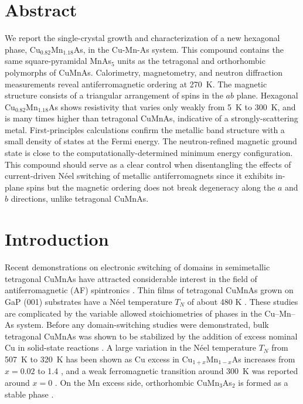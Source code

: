 \documentclass[10pt,doublespacing,edeposit]{uiucthesis2020}
\begin{document}
\begin{mainmatter}

\section{Abstract}
We report the single-crystal growth and characterization of a new hexagonal phase, Cu$_{0.82}$Mn$_{1.18}$As, in the Cu-Mn-As system. 
This compound contains the same square-pyramidal MnAs$_5$ units as the tetragonal and orthorhombic polymorphs of CuMnAs.
Calorimetry, magnetometry, and neutron diffraction measurements reveal antiferromagnetic ordering at 270~K.
The magnetic structure consists of a triangular arrangement of spins in the $ab$ plane. 
Hexagonal Cu$_{0.82}$Mn$_{1.18}$As shows resistivity that varies only weakly from 5~K to 300~K, and is many times higher than tetragonal CuMnAs, indicative of a strongly-scattering metal.
First-principles calculations confirm the metallic band structure with a small density of states at the Fermi energy. The neutron-refined
magnetic ground state is close to the computationally-determined minimum energy configuration. This compound should serve as a clear control when disentangling the effects of current-driven N\'{e}el switching of metallic antiferromagnets since it exhibits in-plane spins but the magnetic ordering does not break degeneracy along the $a$ and $b$ directions, unlike tetragonal CuMnAs.


\section{Introduction} 

Recent demonstrations on electronic switching of domains in  semimetallic tetragonal CuMnAs have attracted considerable interest in the field of antiferromagnetic (AF) spintronics \cite{Wadley2016,Grzybowski2017,Wadley2018,Matalla-Wagner2019}. Thin films of tetragonal CuMnAs grown on GaP (001) substrates have a N\'eel temperature $T_N$ of about 480 K \cite{Wadley2015,Hills2015}.
These studies are complicated by the variable allowed stoichiometries of  phases in the Cu--Mn--As system.
Before any domain-switching studies were demonstrated, bulk tetragonal CuMnAs was shown to be 
stabilized by the addition of excess nominal Cu in solid-state reactions \cite{Uhlirova2015}.
A large variation in the N\'{e}el temperature $T_N$ from 507~K to 320~K has been shown as Cu excess in Cu$_{1+x}$Mn$_{1-x}$As increases from $x = 0.02$ to 1.4 \cite{Uhlirova2019}, and a weak ferromagnetic transition around 300~K was reported around $x=0$ \cite{Nateprov2011}.
On the Mn excess side, orthorhombic CuMn$_3$As$_2$ is formed as a stable phase \cite{Uhlirova2015}.
 

\end{mainmatter}
\end{document}
